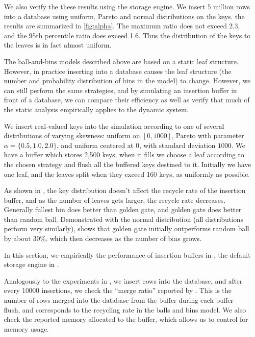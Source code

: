 

We also verify the these results using the \innodb{} storage engine. We insert
5 million rows into a database using uniform, Pareto and normal distributions
on the keys. the results are summarized in \cref{fig:alpha}. The maximum ratio
does not exceed 2.3, and the 95th percentile ratio does exceed 1.6. Thus the
distribution of the keys to the leaves is in fact almost uniform.


The ball-and-bins models described above are based on a static leaf structure.
However, in practice inserting into a database causes the leaf structure (the
number and probability distribution of bins in the model) to change. However,
we can still perform the same strategies, and by simulating an insertion buffer
in front of a database, we can compare their efficiency as well as verify that
much of the static analysis empirically applies to the dynamic system.

We insert real-valued keys into the simulation according to one of several
distributions of varying skewness: uniform on $[0,1000]$, Pareto with parameter
$\alpha=\{0.5,1.0,2.0\}$, and uniform centered at 0, with standard deviation
$1000$. We have a buffer which stores 2,500 keys; when it fills we choose a
leaf according to the chosen strategy and flush all the buffered keys destined
to it. Initially we have one leaf, and the leaves split when they exceed 160
keys, as uniformly as possible. 

As shown in , the key distribution doesn't affect the recycle
rate of the insertion buffer, and as the number of leaves gets larger, the
recycle rate decreases. Generally fullest bin does better than golden gate, and
golden gate does better than random ball. Demonstrated with the normal
distribution (all distributions perform very similarly), 
shows that golden gate initially outperforms random ball by about 30\%, which
then decreases as the number of bins grows.




In this section, we empirically the performance of insertion buffers in
\innodb{}, the default storage engine in \mysql{}.

Analogously to the experiments in , we insert rows into
the \mysql{} database, and after every 10000 insertions, we check the ``merge
ratio'' reported by \innodb{}.  This is the number of rows merged into the
database from the buffer during each buffer flush, and corresponds to the
recycling rate in the balls and bins model. We also check the reported memory
allocated to the buffer, which allows us to control for memory usage. 

